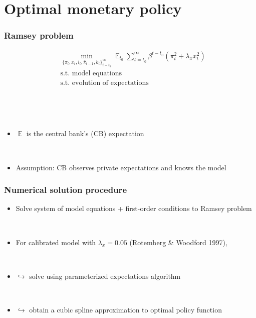 \documentclass[10pt]{beamer}
\DeclareMathOperator{\E}{\mathbb{E}}
\begin{document}

\section{Optimal monetary policy}


\begin{frame}
	\frametitle{Ramsey problem}\label{ramsey}
	 \begin{align*}
& \min_{ \{\pi_t, x_t, i_t, \bar{\pi}_{t-1}, k_t \}_{t=t_0}^{\infty}} \E_{t_0}\sum_{t=t_0}^{\infty} \beta^{t-t_0} (\pi_t^2  + \lambda_x x_t^2 )  \\
& \text{s.t. model equations} \\
& \text{s.t. evolution of expectations} 
\end{align*}

\

\

\begin{itemize}
\item $\E$ is the central bank's (CB) expectation

\

\item Assumption: CB observes private expectations and knows the model

\end{itemize}

\vfill
 \hfill \hyperlink{anchTC}{}

\end{frame}

\begin{frame}[plain]  %
	\frametitle{Numerical solution procedure}
	
\begin{itemize}
\item[] Solve system of model equations + first-order conditions to Ramsey problem

\

\item[] For calibrated model with $\lambda_x = 0.05$ (Rotemberg \& Woodford 1997),


\

\item[] $\hookrightarrow$ solve using parameterized expectations algorithm

\


\item[] $\hookrightarrow$ obtain a cubic spline approximation to optimal policy function

\

\end{itemize}


\end{frame}
\end{document}
